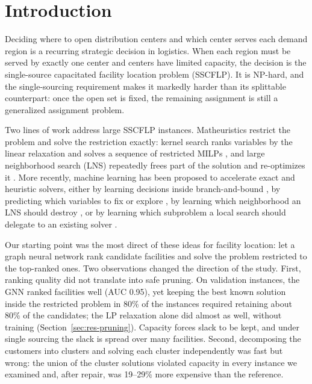 \section{Introduction}\label{sec:intro}

Deciding where to open distribution centers and which center serves each demand region is a
recurring strategic decision in logistics. When each region must be served by exactly one
center and centers have limited capacity, the decision is the single-source capacitated
facility location problem (SSCFLP). It is NP-hard, and the single-sourcing requirement makes it
markedly harder than its splittable counterpart: once the open set is fixed, the remaining
assignment is still a generalized assignment problem.

Two lines of work address large SSCFLP instances. Matheuristics restrict the problem and solve
the restriction exactly: kernel search ranks variables by the linear relaxation and solves a
sequence of restricted MILPs \citep{guastaroba2014}, and large neighborhood search (LNS)
repeatedly frees part of the solution and re-optimizes it \citep{kong2021}. More recently,
machine learning has been proposed to accelerate exact and heuristic solvers, either by
learning decisions inside branch-and-bound \citep{gasse2019,gupta2020}, by predicting which
variables to fix or explore \citep{nair2020,han2023}, by learning which neighborhood an LNS
should destroy \citep{song2020,sonnerat2021,huang2023}, or by learning which subproblem a local
search should delegate to an existing solver \citep{li2021delegate}.

Our starting point was the most direct of these ideas for facility location: let a graph neural
network rank candidate facilities and solve the problem restricted to the top-ranked ones. Two
observations changed the direction of the study. First, ranking quality did not translate into
safe pruning. On validation instances, the GNN ranked facilities well (AUC 0.95), yet keeping
the best known solution inside the restricted problem in 80\% of the instances required
retaining about 80\% of the candidates; the LP relaxation alone did almost as well, without
training (Section~\ref{sec:res-pruning}). Capacity forces slack to be kept, and under single
sourcing the slack is spread over many facilities. Second, decomposing the customers into
clusters and solving each cluster independently was fast but wrong: the union of the cluster
solutions violated capacity in every instance we examined and, after repair, was 19--29\% more
expensive than the reference.

